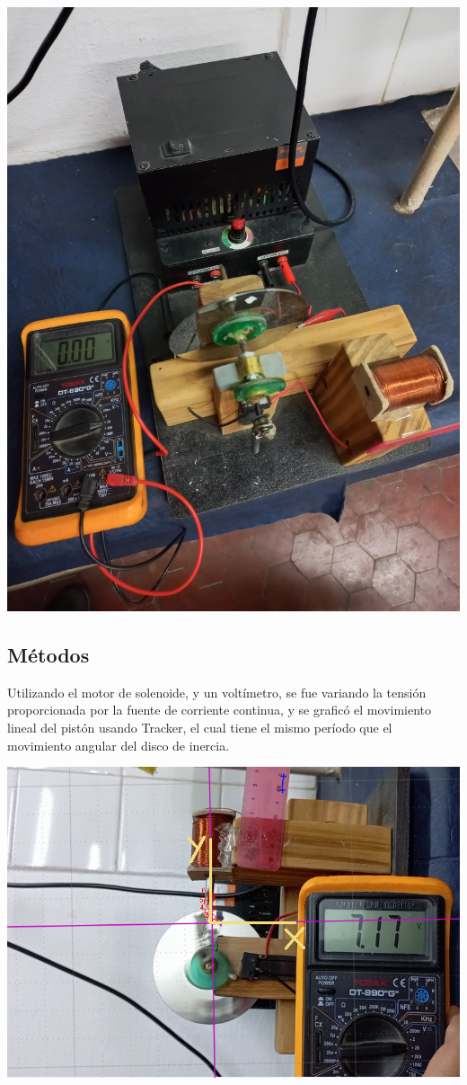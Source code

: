 \documentclass[a4paper,12pt]{article}
\newenvironment{Figure}
    {\par\medskip\noindent\minipage{\linewidth}}
    {\endminipage\par\medskip}
\begin{document}
        \begin{Figure}
            \centering
            
            \includegraphics[width=0.4\linewidth]{motorSolenoide_superior.jpg}
            \label{fig: motorSolenoide_superior}


        \end{Figure}

    \subsection*{Métodos}

        Utilizando el motor de solenoide, y un voltímetro, se fue variando la tensión proporcionada por la fuente de corriente continua, y se graficó el movimiento lineal del pistón usando Tracker, el cual tiene el mismo período que el movimiento angular del disco de inercia.

        \begin{Figure}
            \centering

            \includegraphics[width=0.5\linewidth]{mediciones_movimientoLinealCoordenadas.png}
            \label{fig: mediciones_movimientoLinealCoordenadas}
        \end{Figure}
\end{document}
